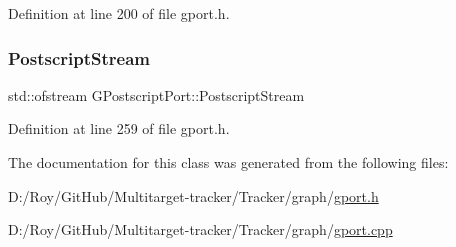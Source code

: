 Definition at line 200 of file gport.\+h.

\mbox{\label{class_g_postscript_port_a0fb398f1c65b3ccb0efccd509f60d20d}} 
\subsubsection{\texorpdfstring{Postscript\+Stream}{PostscriptStream}}
{\footnotesize\ttfamily std\+::ofstream G\+Postscript\+Port\+::\+Postscript\+Stream\hspace{0.3cm}{\ttfamily [protected]}}



Definition at line 259 of file gport.\+h.



The documentation for this class was generated from the following files\+:\begin{DoxyCompactItemize}
\item 
D\+:/\+Roy/\+Git\+Hub/\+Multitarget-\/tracker/\+Tracker/graph/\mbox{\hyperlink{gport_8h}{gport.\+h}}\item 
D\+:/\+Roy/\+Git\+Hub/\+Multitarget-\/tracker/\+Tracker/graph/\mbox{\hyperlink{gport_8cpp}{gport.\+cpp}}\end{DoxyCompactItemize}
